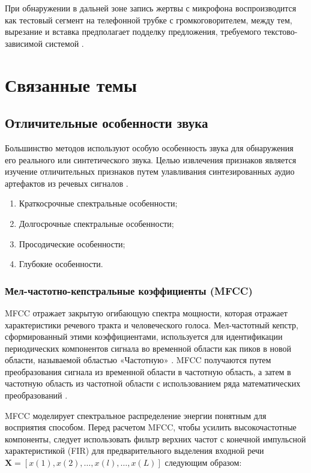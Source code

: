 При обнаружении в дальней зоне запись жертвы с микрофона воспроизводится как тестовый сегмент на телефонной трубке с громкоговорителем, между тем, вырезание и вставка предполагает подделку предложения, требуемого текстово-зависимой системой \cite{detection-replay-based}.


\section{Связанные темы}

\subsection{Отличительные особенности звука}

Большинство методов используют особую особенность звука для обнаружения его реального или синтетического звука. Целью извлечения признаков является изучение отличительных признаков путем улавливания синтезированных аудио артефактов из речевых сигналов \cite{discrim-features}.
 
\begin{enumerate}
    \item Краткосрочные спектральные особенности;
    \item Долгосрочные спектральные особенности;
    \item Просодические особенности;
    \item Глубокие особенности.
\end{enumerate}



\subsubsection{Мел-частотно-кепстральные коэффициенты (MFCC)}

MFCC отражает закрытую огибающую спектра мощности, которая отражает характеристики речевого тракта и человеческого голоса. Мел-частотный кепстр, сформированный этими коэффициентами, используется для идентификации периодических компонентов сигнала во временной области как пиков в новой области, называемой областью «Частотную» \cite{mfcc-01}. MFCC получаются путем преобразования сигнала из временной области в частотную область, а затем в частотную область из частотной области с использованием ряда математических преобразований \cite{mfcc-02}.

MFCC моделирует спектральное распределение энергии понятным для восприятия способом. Перед расчетом MFCC, чтобы усилить высокочастотные компоненты, следует использовать фильтр верхних частот с конечной импульсной характеристикой (FIR) для предварительного выделения входной речи \(\mathbf{X} = [x(1), x(2), \ldots, x(l), \ldots, x(L)]\) следующим образом:

